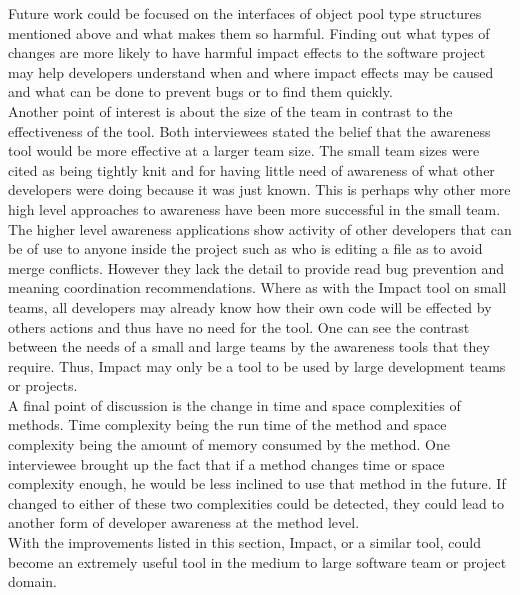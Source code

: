 \documentclass[conference]{IEEEtran}
\begin{document}
Future work could be focused on the interfaces of object pool type structures mentioned
above and what makes them so harmful. Finding out what types of changes are more
likely to have harmful impact effects to the software project may help developers understand
when and where impact effects may be caused and what can be done to prevent bugs 
or to find them quickly.\\

Another point of interest is about the size of the team in contrast to the effectiveness
of the tool. Both interviewees stated the belief that the awareness tool would be more
effective at a larger team size. The small team sizes were cited as being tightly knit and
for having little need of awareness of what other developers were doing because it
was just known. This is perhaps why other more high level approaches to awareness have
been more successful in the small team. The higher level awareness applications 
show activity of other developers that can be of use to anyone inside the project such 
as who is editing a file as to avoid merge conflicts. However they lack the detail to
provide read bug prevention and meaning coordination recommendations. Where as
with the Impact tool on small teams, all developers may already know how their own code
will be effected by others actions and thus have no need for the tool. One can see the
contrast between the needs of a small and large teams by the awareness tools that they
require. Thus, Impact may only be a tool to be used by large development teams or
projects.\\

A final point of discussion is the change in time and space complexities of methods.
Time complexity being the run time of the method and space complexity being
the amount of memory consumed by the method.
One interviewee brought up the fact that if a method changes time or space
complexity enough, he would be less inclined to use that method in the future.
If changed to either of these two complexities could be detected, they could lead
to another form of developer awareness at the method level.\\

With the improvements listed in this section, Impact, or a similar tool, could become
an extremely useful tool in the medium to large software team or project
domain. \\
\end{document}
